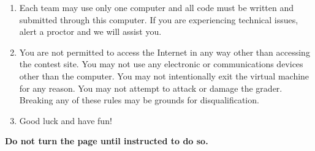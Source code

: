 \begin{enumerate}
    \item Each team may use only one computer and all code must be written and submitted through this computer. If you are experiencing technical issues, alert a proctor and we will assist you.
    \item You are not permitted to access the Internet in any way other than accessing the contest site. You may not use any electronic or communications devices other than the computer. You may not intentionally exit the virtual machine for any reason. You may not attempt to attack or damage the grader. Breaking any of these rules may be grounds for disqualification.
    \item Good luck and have fun!
\end{enumerate}

\blank

\begin{center}
\textbf{\LARGE Do not turn the page until instructed to do so.}
\end{center}


